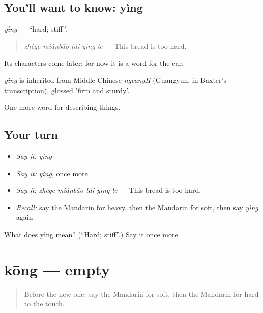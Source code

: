 \subsection*{You'll want to know: yìng}
\emph{yìng} — \textquotedblleft{}hard; stiff\textquotedblright{}.

\begin{quote}
\emph{zhège miànbāo tài yìng le} — This bread is too hard.
\end{quote}

Its characters come later; for now it is a word for the ear.

\begin{cousinweb}
\emph{yìng} is inherited from Middle Chinese \emph{ngeangH} (Guangyun, in Baxter's transcription), glossed 'firm and sturdy'.
\end{cousinweb}

\begin{grammarlens}[title={What you've built}]
One more word for describing things.
\end{grammarlens}

\subsection*{Your turn}
\begin{itemize}
\raggedright
  \item \emph{Say it:} \emph{yìng}
  \item \emph{Say it:} \emph{yìng}, once more
  \item \emph{Say it:} \emph{zhège miànbāo tài yìng le} — This bread is too hard.
  \item \emph{Recall:} say the Mandarin for heavy, then the Mandarin for soft, then say \emph{yìng} again
\end{itemize}

\begin{tcolorbox}[breakable,colback=teal!4,colframe=teal!35!black,title={Before you move on}]
What does yìng mean? (\textquotedblleft{}Hard; stiff\textquotedblright{}.) Say it once more.
\end{tcolorbox}
\section[kōng]{kōng — empty}

\label{lesson:ZH-C134-kong}



\begin{quote}
Before the new one: say the Mandarin for soft, then the Mandarin for hard to the touch.
\end{quote}

